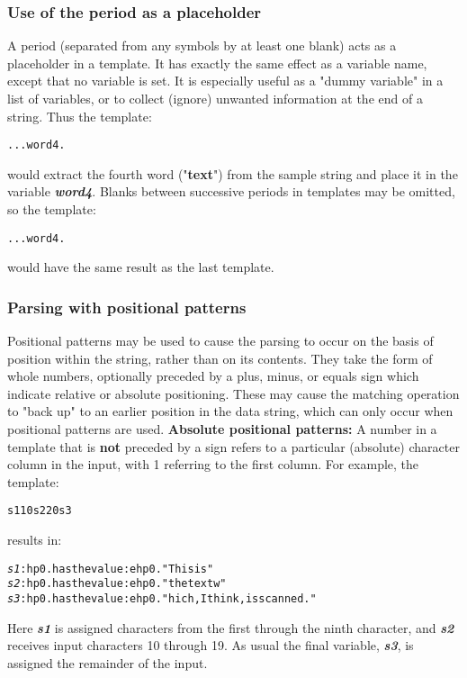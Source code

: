 \subsubsection{Use of the period as a placeholder}\label{refplaceh}
 A period (separated from any symbols by at least one blank) acts as a
placeholder in a template.
It has exactly the same effect as a variable name, except that no
variable is set.
It is especially useful as a "dummy variable" in a list of
variables, or to collect (ignore) unwanted information at the end of a
string.  Thus the template:
\begin{alltt}
 . . . word4 .
\end{alltt}
would extract the fourth word ("\textbf{text}") from the sample
string and place it in the variable \textbf{\emph{word4}}.
Blanks between successive periods in templates may be omitted, so the
template:
\begin{alltt}
 ... word4 .
\end{alltt}
would have the same result as the last template.
\subsubsection{Parsing with positional patterns}
 Positional patterns may be used to cause the parsing to occur on the
basis of position within the string, rather than on its contents.
They take the form of whole numbers, optionally preceded by a plus,
minus, or equals sign which indicate relative or absolute positioning.
These may cause the matching operation to "back up" to an earlier
position in the data string, which can only occur when positional
patterns are used.
 \textbf{Absolute positional patterns:}
A number in a template that is \textbf{not} preceded by a sign
refers to a particular (absolute)
character column in the input, with 1 referring to the first
column.
For example, the template:
\begin{alltt}
s1 10 s2 20 s3
\end{alltt}
results in:
\begin{alltt}
\emph{s1} :hp0.has the value:ehp0. "This is  "
\emph{s2} :hp0.has the value:ehp0. "the text w"
\emph{s3} :hp0.has the value:ehp0. "hich, I think,  is scanned."
\end{alltt}
 Here \textbf{\emph{s1}} is assigned characters from the first
through the ninth character, and \textbf{\emph{s2}} receives input
characters 10 through 19.
As usual the final variable, \textbf{\emph{s3}}, is assigned the
remainder of the input.
 
